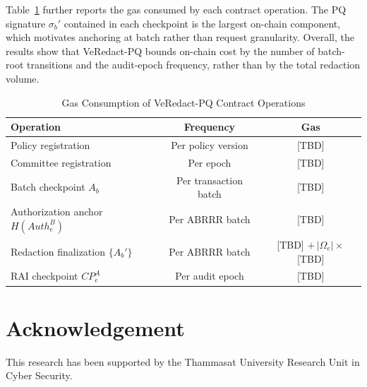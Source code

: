 \documentclass[lettersize,journal]{IEEEtran}
\begin{document}
    Table~\ref{tab:gas} further reports the gas consumed by each contract
    operation. The PQ signature $\sigma_b'$ contained in each checkpoint is
    the largest on-chain component, which motivates anchoring at batch
    rather than request granularity. Overall, the results show that
    VeRedact-PQ bounds on-chain cost by the number of batch-root transitions
    and the audit-epoch frequency, rather than by the total redaction volume.
    
    \begin{table}[t]
    \centering
    \caption{Gas Consumption of VeRedact-PQ Contract Operations}
    \label{tab:gas}
    \scriptsize
    \renewcommand{\arraystretch}{1.08}
    \setlength{\tabcolsep}{4pt}
    \begin{tabular}{lcc}
    \hline
    \textbf{Operation} & \textbf{Frequency} & \textbf{Gas} \\
    \hline
    Policy registration & Per policy version & [TBD] \\
    Committee registration & Per epoch & [TBD] \\
    Batch checkpoint $A_b$ & Per transaction batch & [TBD] \\
    Authorization anchor $H(Auth_e^B)$ & Per ABRRR batch & [TBD] \\
    Redaction finalization $\{A_b'\}$ & Per ABRRR batch & [TBD] $+\,|\Omega_e|\times$[TBD] \\
    RAI checkpoint $CP_e^A$ & Per audit epoch & [TBD] \\
    \hline
    \end{tabular}
    \end{table}
    
    \section{Acknowledgement}
    This research has been supported by the Thammasat University Research Unit in Cyber Security.
    
\end{document}
